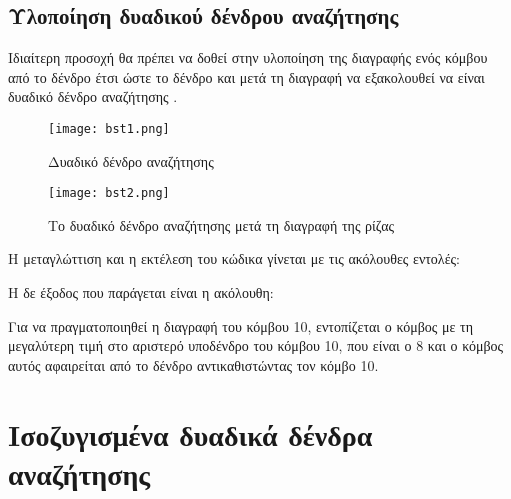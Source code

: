 \subsection{Υλοποίηση δυαδικού δένδρου αναζήτησης}

Ιδιαίτερη προσοχή θα πρέπει να δοθεί στην υλοποίηση της διαγραφής ενός κόμβου από το δένδρο έτσι ώστε το δένδρο και μετά τη διαγραφή να εξακολουθεί να είναι δυαδικό δένδρο αναζήτησης \cite{jumping_into_cpp}. 

\begin{figure}[!tbp]
  \centering
  \begin{minipage}[b]{0.4\textwidth}
    \texttt{[image: bst1.png]}
    \label{fig:bst1}
    \caption{Δυαδικό δένδρο αναζήτησης}
  \end{minipage}
  \hfill
  \begin{minipage}[b]{0.4\textwidth}
    \texttt{[image: bst2.png]}
    \label{fig:bst2}
    \caption{Το δυαδικό δένδρο αναζήτησης μετά τη διαγραφή της ρίζας}
  \end{minipage}
\end{figure}







Η μεταγλώττιση και η εκτέλεση του κώδικα γίνεται με τις ακόλουθες εντολές:



Η δε έξοδος που παράγεται είναι η ακόλουθη:



Για να πραγματοποιηθεί η διαγραφή του κόμβου 10, εντοπίζεται ο κόμβος με τη μεγαλύτερη τιμή στο αριστερό υποδένδρο του κόμβου 10, που είναι ο 8 και ο κόμβος αυτός αφαιρείται από το δένδρο αντικαθιστώντας τον κόμβο 10.

\section{Ισοζυγισμένα δυαδικά δένδρα αναζήτησης}
\label{bbst}

